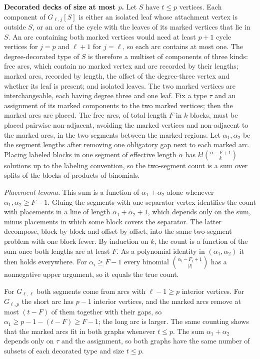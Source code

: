 \documentclass[
  11pt,
  a4paper,
]{report}
\begin{document}
\textbf{Decorated decks of size at most \(p\).} Let \(S\) have
\(t\le p\) vertices. Each component of \(G_{\ell,j}[S]\) is either an
isolated leaf whose attachment vertex is outside \(S\), or an arc of the
cycle with the leaves of its marked vertices that lie in \(S\). An arc
containing both marked vertices would need at least \(p+1\) cycle
vertices for \(j=p\) and \(\ell+1\) for \(j=\ell\), so each arc contains
at most one. The degree-decorated type of \(S\) is therefore a multiset
of components of three kinds: free arcs, which contain no marked vertex
and are recorded by their lengths; marked arcs, recorded by length, the
offset of the degree-three vertex and whether its leaf is present; and
isolated leaves. The two marked vertices are interchangeable, each
having degree three and one leaf. Fix a type \(\tau\) and an assignment
of its marked components to the two marked vertices; then the marked
arcs are placed. The free arcs, of total length \(F\) in \(k\) blocks,
must be placed pairwise non-adjacent, avoiding the marked vertices and
non-adjacent to the marked arcs, in the two segments between the marked
regions. Let \(\alpha_1,\alpha_2\) be the segment lengths after removing
one obligatory gap next to each marked arc. Placing labeled blocks in
one segment of effective length \(\alpha\) has
\(k!\binom{\alpha-F+1}{k}\) solutions up to the labeling convention, so
the two-segment count is a sum over splits of the blocks of products of
binomials.

\emph{Placement lemma.} This sum is a function of \(\alpha_1+\alpha_2\)
alone whenever \(\alpha_1,\alpha_2\ge F-1\). Gluing the segments with
one separator vertex identifies the count with placements in a line of
length \(\alpha_1+\alpha_2+1\), which depends only on the sum, minus
placements in which some block covers the separator. The latter
decompose, block by block and offset by offset, into the same
two-segment problem with one block fewer. By induction on \(k\), the
count is a function of the sum once both lengths are at least \(F\). As
a polynomial identity in \((\alpha_1,\alpha_2)\) it then holds
everywhere. For \(\alpha_i\ge F-1\) every binomial
\(\binom{\alpha_i-F_I+1}{|I|}\) has a nonnegative upper argument, so it
equals the true count.

For \(G_{\ell,\ell}\) both segments come from arcs with \(\ell-1\ge p\)
interior vertices. For \(G_{\ell,p}\) the short arc has \(p-1\) interior
vertices, and the marked arcs remove at most \((t-F)\) of them together
with their gaps, so \(\alpha_1\ge p-1-(t-F)\ge F-1\); the long arc is
larger. The same counting shows that the marked arcs fit in both graphs
whenever \(t\le p\). The sum \(\alpha_1+\alpha_2\) depends only on
\(\tau\) and the assignment, so both graphs have the same number of
subsets of each decorated type and size \(t\le p\).
\end{document}

